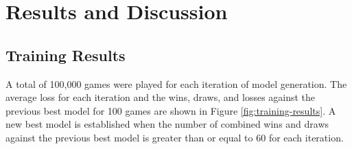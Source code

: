 \chapter{Results and Discussion}

\section{Training Results}

A total of 100,000 games were played for each iteration of model generation. The average loss for each iteration and the wins, draws, and losses against the previous best model for 100 games are shown in Figure \ref{fig:training-results}. A new best model is established when the number of combined wins and draws against the previous best model is greater than or equal to 60 for each iteration.

\wdltraindata

